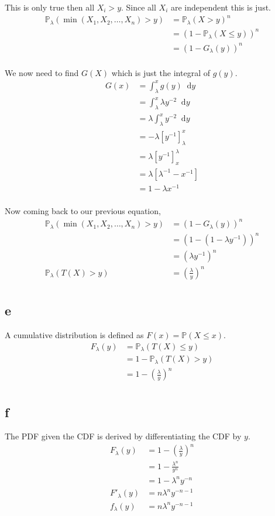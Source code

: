 \documentclass{article}
\newcommand{\diff}{\mathop{}\!\mathrm{d}}
\newcommand{\prob}{\mathbb{P}}
\begin{document}
This is only true then all $X_i > y$. Since all $X_i$ are independent this is
just.
\begin{align*}
    \prob_\lambda (\min (X_1, X_2, \ldots, X_n) > y) &= \prob_\lambda (X > y)^n \\
    &= (1-\prob_\lambda (X \leq y))^n \\
    &= (1-G_\lambda(y))^n \\
\end{align*}

We now need to find $G(X)$ which is just the integral of $g(y)$.
\begin{align*}
    G(x) &= \int_{\lambda}^x g(y) \diff y \\
    &= \int_{\lambda}^x \lambda y^{-2} \diff y \\
    &= \lambda \int_{\lambda}^x y^{-2} \diff y \\
    &= - \lambda \left[ y^{-1} \right]_\lambda^x \\
    &= \lambda \left[ y^{-1} \right]^\lambda_x \\
    &= \lambda \left[ \lambda^{-1} - x^{-1} \right] \\
    &= 1 - \lambda x^{-1} \\
\end{align*}

Now coming back to our previous equation,
\begin{align*}
    \prob_\lambda (\min (X_1, X_2, \ldots, X_n) > y) &= (1-G_\lambda(y))^n \\
    &= (1-(1 - \lambda y^{-1}))^n \\
    &= (\lambda y^{-1})^n \\
    \prob_\lambda (T(X) > y) &= \left(\frac{\lambda}{y}\right)^n \\
\end{align*}

\subsection{e}
A cumulative distribution is defined as $F(x) = \prob (X \leq x)$.
\begin{align*}
    F_\lambda (y) &= \prob_\lambda (T(X) \leq y) \\
    &= 1 - \prob_\lambda (T(X) > y) \\
    &= 1 - \left(\frac{\lambda}{y}\right)^n \\
\end{align*}

\subsection{f}
The PDF given the CDF is derived by differentiating the CDF by $y$.
\begin{align*}
    F_\lambda (y) &= 1 - \left(\frac{\lambda}{y}\right)^n \\
    &= 1 - \frac{\lambda^n}{y^n} \\
    &= 1 - \lambda^n y^{-n} \\
    {F'}_\lambda (y) &= n \lambda^n y^{-n-1} \\
    f_\lambda (y) &= n \lambda^n y^{-n-1} \\
\end{align*}
\end{document}
